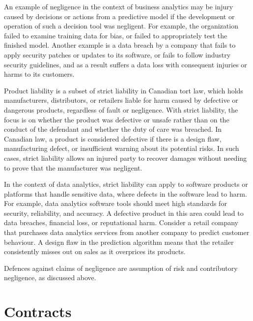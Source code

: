 An example of negligence in the context of business analytics may be injury caused by decisions or actions from a predictive model if the development or operation of such a decision tool was negligent. For example, the organization failed to examine training data for bias, or failed to appropriately test the finished model. Another example is a data breach by a company that fails to apply security patches or updates to its software, or fails to follow industry security guidelines, and as a result suffers a data loss with consequent injuries or harms to its customers.

Product liability is a subset of strict liability in Canadian tort law, which holds manufacturers, distributors, or retailers liable for harm caused by defective or dangerous products, regardless of fault or negligence. With strict liability, the focus is on whether the product was defective or unsafe rather than on the conduct of the defendant and whether the duty of care was breached. In Canadian law, a product is considered defective if there is a design flaw, manufacturing defect, or insufficient warning about its potential risks. In such cases, strict liability allows an injured party to recover damages without needing to prove that the manufacturer was negligent.

In the context of data analytics, strict liability can apply to software products or platforms that handle sensitive data, where defects in the software lead to harm. For example, data analytics software tools should meet high standards for security, reliability, and accuracy. A defective product in this area could lead to data breaches, financial loss, or reputational harm. Consider a retail company that purchases data analytics services from another company to predict customer behaviour. A design flaw in the prediction algorithm means that the retailer consistently misses out on sales as it overprices its products. 

Defences against claims of negligence are assumption of risk and contributory negligence, as discussed above. 

\section{Contracts}

